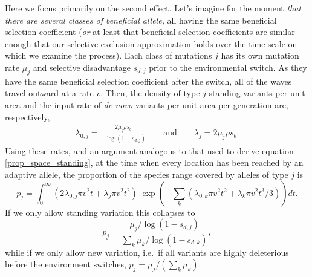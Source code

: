 \documentclass{article}
\newcommand{\gc}[1]{{\it\color{blue}#1}}
\newcommand{\plr}[1]{{\it\color{Fuchsia}#1}}
\begin{document}
Here we focus primarily on the second effect. 
Let's imagine for the moment \plr{that there are several classes of beneficial allele,}
all having the same beneficial selection coefficient 
(\gc{or} at least that beneficial selection coefficients are similar enough that our selective exclusion
approximation holds over the time scale on which we examine the process).
Each class of mutations $j$ has its own mutation rate $\mu_j$ and selective disadvantage $s_{d,j}$ prior to the environmental switch. 
As they have the same beneficial selection coefficient after the switch, 
all of the waves travel outward at a rate $v$. 
Then, the density of type $j$ standing variants per unit area 
and the input rate of \textit{de novo} variants per unit area per generation are, respectively,
\begin{align}
  \lambda_{0,j} = \frac{ 2 \mu_j \rho s_b }{ -\log(1-s_{d,j}) } \qquad \text{and} \qquad    \lambda_{j} = 2 \mu_j \rho s_b .
\end{align}
Using these rates, and an argument analogous to that used to derive
equation \eqref{prop_space_standing},
at the time when every location has been reached by an adaptive allele,
the proportion of the species range covered by alleles of type $j$ is
\begin{equation} \label{eqn-prop-space-allele-j}
    p_j = \int_0^\infty  \left( 2 \lambda_{0,j} \pi v^2 t +  \lambda_j \pi v^2 t^2 \right)  
    \; \exp \left( - \sum_k ( \lambda_{0,k} \pi v^2 t^2 + \lambda_k
      \pi v^2 t^3 / 3 ) \right) dt .  %
\end{equation}
If we only allow standing variation this collapses to 
\begin{equation}  \label{eqn-prop-space-allele-j-standing-room-only}
    p_j = \frac{  \mu_j / \log(1-s_{d,j}) }{\sum_k  \mu_k / \log(1-s_{d,k}) } ,
\end{equation}
while if we only allow new variation, 
i.e.\ if all variants are highly deleterious before the environment switches, 
 $p_j =\mu_j / (\sum_k  \mu_k)$.
\end{document}
